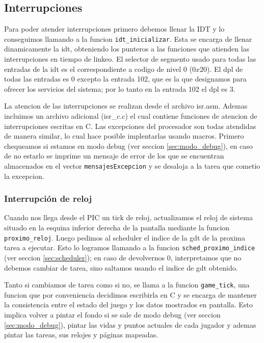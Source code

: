 \subsection{Interrupciones}

Para poder atender interrupciones primero debemos llenar la IDT y lo conseguimos llamando a la funcion \verb|idt_inicializar|. Esta se encarga de llenar dinamicamente la idt, obteniendo los punteros a las funciones que atienden las interrupciones en tiempo de linkeo. El selector de segmento usado para todas las entradas de la idt es el correspondiente a codigo de nivel 0 ($0x20$). El dpl de todas las entradas es 0 excepto la entrada 102, que es la que designamos para ofrecer los servicios del sistema; por lo tanto en la entrada 102 el dpl es 3.

La atencion de las interrupciones se realizan desde el archivo isr.asm. Ademas incluimos un archivo adicional (isr\_c.c) el cual contiene funciones de atencion de interrupciones escritas en C. 
Las excepciones del procesador son todas atendidas de manera similar, lo cual hace posible implentarlas usando macros. Primero chequeamos si estamos en modo debug (ver seccion \ref{sec:modo_debug}), en caso de no estarlo se imprime un mensaje de error de los que se encuentran almacenados en el vector \verb|mensajesExcepcion| y se desaloja a la tarea que cometio la excepcion. 



\subsubsection{Interrupción de reloj}

\label{subsec:int-reloj}

Cuando nos llega desde el PIC un tick de reloj, actualizamos el reloj de sistema situado en la esquina inferior derecha de la pantalla mediante la funcion \verb|proximo_reloj|. Luego pedimos al scheduler el indice de la gdt de la proxima tarea a ejecutar. Esto lo logramos llamando a la funcion \verb|sched_proximo_indice| (ver seccion \ref{sec:scheduler}); en caso de devolvernos 0, interpretamos que no debemos cambiar de tarea, sino saltamos usando el indice de gdt obtenido.

Tanto si cambiamos de tarea como si no, se llama a la funcion \verb|game_tick|, una funcion que por conveniencia decidimos escribirla en C y se encarga de mantener la consistencia entre el estado del juego y los datos mostrados en pantalla. 
Esto implica volver a pintar el fondo si se sale de modo debug (ver seccion \ref{sec:modo_debug}), pintar las vidas y puntos actuales de cada jugador y ademas pintar las tareas, sus relojes y p\'aginas mapeadas.



